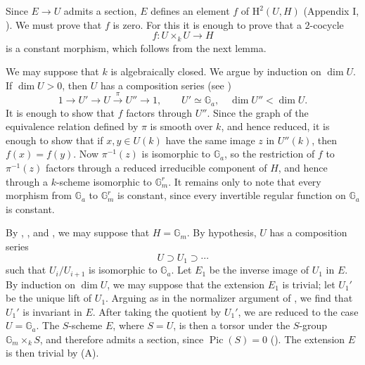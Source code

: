 Since \(E\longrightarrow U\) admits a section, \(E\) defines an
element \(f\) of \(\mathrm H^2(U,H)\) (Appendix I, ).  We must
prove that \(f\) is zero.  For this it is enough to prove that a
\(2\)-cocycle
\[
  f:U\times_kU\longrightarrow H
\]
is a constant morphism, which follows from the next lemma.


We may suppose that \(k\) is algebraically closed.  We argue by
induction on \(\dim U\).  If \(\dim U>0\), then \(U\) has a
composition series (see )
\[
  1\longrightarrow U'\longrightarrow U
    \xrightarrow{\ \pi\ }U''\longrightarrow1,
  \qquad
  U'\simeq\mathbb G_a,\quad \dim U''<\dim U.
\]
It is enough to show that \(f\) factors through \(U''\).  Since
the graph of the equivalence relation defined by \(\pi\) is
smooth over \(k\), and hence reduced, it is enough to show that
if \(x,y\in U(k)\) have the same image \(z\) in \(U''(k)\), then
\(f(x)=f(y)\).  Now \(\pi^{-1}(z)\) is isomorphic to
\(\mathbb G_a\), so the restriction of \(f\) to
\(\pi^{-1}(z)\) factors through a reduced irreducible component
of \(H\), and hence through a \(k\)-scheme isomorphic to
\(\mathbb G_m^r\).  It remains only to note that every morphism
from \(\mathbb G_a\) to \(\mathbb G_m^r\) is constant, since
every invertible regular function on \(\mathbb G_a\) is
constant.

By , , and , we may suppose that
\(H=\mathbb G_m\).  By hypothesis, \(U\) has a composition series
\[
  U\supset U_1\supset\cdots
\]
such that \(U_i/U_{i+1}\) is isomorphic to \(\mathbb G_a\).  Let
\(E_1\) be the inverse image of \(U_1\) in \(E\).  By induction
on \(\dim U\), we may suppose that the extension \(E_1\) is
trivial; let \(U_1'\) be the unique lift of \(U_1\).  Arguing as
in the normalizer argument of , we find that \(U_1'\) is
invariant in \(E\).  After taking the quotient by \(U_1'\), we
are reduced to the case \(U=\mathbb G_a\).  The \(S\)-scheme
\(E\), where \(S=U\), is then a torsor under the \(S\)-group
\(\mathbb G_m\times_kS\), and therefore admits a section, since
\(\operatorname{Pic}(S)=0\) ().  The extension
\(E\) is then trivial by (A).

